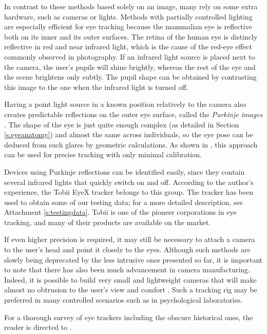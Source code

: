 In contrast to these methods based solely on an image, many rely on some extra hardware, such as cameras or lights.
Methods with partially controlled lighting are especially efficient for eye tracking because the mammalian eye is reflective both on its inner and its outer surfaces.
The retina of the human eye is distincly reflective in red and near infrared light, which is the cause of the red-eye effect commonly observed in photography.
If an infrared light source is placed next to the camera, the user's pupils will shine brightly, whereas the rest of the eye and the scene brightens only subtly.
The pupil shape can be obtained by contrasting this image to the one when the infrared light is turned off.

Having a point light source in a known position relatively to the camera also creates predictable reflections on the outer eye surface, called the \textit{Purkinje images} \cite{hansen10}.
The shape of the eye is just quite enough complex (as detailed in Section \ref{s.eyeanatomy}) and almost the same across individuals, so the eye pose can be deduced from such glares by geometric calculations.
As shown in \cite{villanueva08}, this approach can be used for precise tracking with only minimal calibration.

Devices using Purkinje reflections can be identified easily, since they contain several infrared lights that quickly switch on and off.
According to the author's experience, the Tobii EyeX tracker \cite{tobii} belongs to this group.
The tracker has been used to obtain some of our testing data; for a more detailed description, see Attachment \ref{s:testingdata}.
Tobii is one of the pioneer corporations in eye tracking, and many of their products are available on the market.

If even higher precision is required, it may still be necessary to attach a camera to the user's head and point it closely to the eyes.
Although such methods are slowly being deprecated by the less intrusive ones presented so far, it is important to note that there has also been much advancement in camera manufacturing.
Indeed, it is possible to build very small and lightweight cameras that will make almost no obtrusion to the user's view and comfort \cite{pupil,kassner14}.
Such a tracking rig may be preferred in many controlled scenarios such as in psychological laboratories.

For a thorough survey of eye trackers including the obscure historical ones, the reader is directed to \cite{hansen10}.

